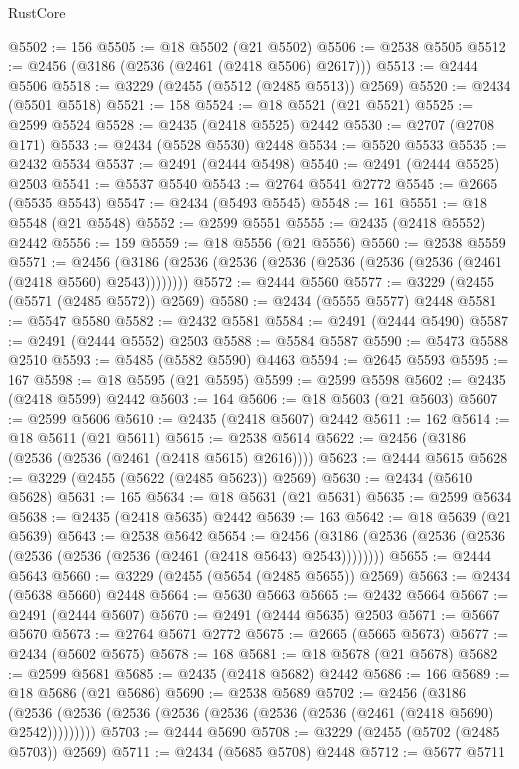 \begin{lexlean}{RustCore}
\begin{coremodule}
@5502 := 156
@5505 := @18 @5502 (@21 @5502)
@5506 := @2538 @5505
@5512 := @2456 (@3186 (@2536 (@2461 (@2418 @5506) @2617)))
@5513 := @2444 @5506
@5518 := @3229 (@2455 (@5512 (@2485 @5513)) @2569)
@5520 := @2434 (@5501 @5518)
@5521 := 158
@5524 := @18 @5521 (@21 @5521)
@5525 := @2599 @5524
@5528 := @2435 (@2418 @5525) @2442
@5530 := @2707 (@2708 @171)
@5533 := @2434 (@5528 @5530) @2448
@5534 := @5520 @5533
@5535 := @2432 @5534
@5537 := @2491 (@2444 @5498)
@5540 := @2491 (@2444 @5525) @2503
@5541 := @5537 @5540
@5543 := @2764 @5541 @2772
@5545 := @2665 (@5535 @5543)
@5547 := @2434 (@5493 @5545)
@5548 := 161
@5551 := @18 @5548 (@21 @5548)
@5552 := @2599 @5551
@5555 := @2435 (@2418 @5552) @2442
@5556 := 159
@5559 := @18 @5556 (@21 @5556)
@5560 := @2538 @5559
@5571 := @2456 (@3186 (@2536 (@2536 (@2536 (@2536 (@2536 (@2536 (@2461 (@2418 @5560) @2543))))))))
@5572 := @2444 @5560
@5577 := @3229 (@2455 (@5571 (@2485 @5572)) @2569)
@5580 := @2434 (@5555 @5577) @2448
@5581 := @5547 @5580
@5582 := @2432 @5581
@5584 := @2491 (@2444 @5490)
@5587 := @2491 (@2444 @5552) @2503
@5588 := @5584 @5587
@5590 := @5473 @5588 @2510
@5593 := @5485 (@5582 @5590) @4463
@5594 := @2645 @5593
@5595 := 167
@5598 := @18 @5595 (@21 @5595)
@5599 := @2599 @5598
@5602 := @2435 (@2418 @5599) @2442
@5603 := 164
@5606 := @18 @5603 (@21 @5603)
@5607 := @2599 @5606
@5610 := @2435 (@2418 @5607) @2442
@5611 := 162
@5614 := @18 @5611 (@21 @5611)
@5615 := @2538 @5614
@5622 := @2456 (@3186 (@2536 (@2536 (@2461 (@2418 @5615) @2616))))
@5623 := @2444 @5615
@5628 := @3229 (@2455 (@5622 (@2485 @5623)) @2569)
@5630 := @2434 (@5610 @5628)
@5631 := 165
@5634 := @18 @5631 (@21 @5631)
@5635 := @2599 @5634
@5638 := @2435 (@2418 @5635) @2442
@5639 := 163
@5642 := @18 @5639 (@21 @5639)
@5643 := @2538 @5642
@5654 := @2456 (@3186 (@2536 (@2536 (@2536 (@2536 (@2536 (@2536 (@2461 (@2418 @5643) @2543))))))))
@5655 := @2444 @5643
@5660 := @3229 (@2455 (@5654 (@2485 @5655)) @2569)
@5663 := @2434 (@5638 @5660) @2448
@5664 := @5630 @5663
@5665 := @2432 @5664
@5667 := @2491 (@2444 @5607)
@5670 := @2491 (@2444 @5635) @2503
@5671 := @5667 @5670
@5673 := @2764 @5671 @2772
@5675 := @2665 (@5665 @5673)
@5677 := @2434 (@5602 @5675)
@5678 := 168
@5681 := @18 @5678 (@21 @5678)
@5682 := @2599 @5681
@5685 := @2435 (@2418 @5682) @2442
@5686 := 166
@5689 := @18 @5686 (@21 @5686)
@5690 := @2538 @5689
@5702 := @2456
    (@3186 (@2536 (@2536 (@2536 (@2536 (@2536 (@2536 (@2536 (@2461 (@2418 @5690) @2542)))))))))
@5703 := @2444 @5690
@5708 := @3229 (@2455 (@5702 (@2485 @5703)) @2569)
@5711 := @2434 (@5685 @5708) @2448
@5712 := @5677 @5711

\end{coremodule}
\end{lexlean}
